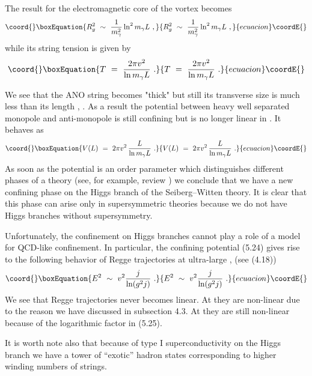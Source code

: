 \documentclass[a4paper,12pt]{article}
\def\la{\mathrel{\mathpalette\fun <}}
\def\fun#1#2{\lower3.6pt\vbox{\baselineskip0pt\lineskip.9pt
\ialign{\myHighlight{$\mathsurround=0pt#1\hfil##\hfil$}\coordHE{}\crcr#2\crcr\sim\crcr}}}
\begin{document}
The result for the electromagnetic core of the vortex becomes
\cite{Y}
\begin{equation}\coord{}\boxEquation{
R^2_g\ \sim\ \frac1{m^2_\gamma}\ln^2m_\gamma L\ ,
}{
R^2_g\ \sim\ \frac1{m^2_\gamma}\ln^2m_\gamma L\ ,
}{ecuacion}\coordE{}\end{equation}
while its string tension is given by \cite{Y}
\begin{equation}\coord{}\boxEquation{
T\ =\ \frac{2\pi v^2}{\ln m_\gamma L}\ .
}{
T\ =\ \frac{2\pi v^2}{\ln m_\gamma L}\ .
}{ecuacion}\coordE{}\end{equation}

We see that the ANO string becomes "thick" but still its
transverse size \coordHE{} is much less than its length \coordHE{}, \coordHE{}. As a result the potential between heavy well separated
monopole and anti-monopole is still  confining but is
no longer linear in \coordHE{}. It behaves
as \cite{Y}
\begin{equation}\coord{}\boxEquation{
V(L)\ =\ 2\pi v^2\, \frac L{\ln m_\gamma L}\ .
}{
V(L)\ =\ 2\pi v^2\, \frac L{\ln m_\gamma L}\ .
}{ecuacion}\coordE{}\end{equation}
 As soon as the
potential \coordHE{} is an order parameter which distinguishes 
different phases of a theory
(see, for example, review
\cite{IS}) we conclude that we have a new confining phase on the
Higgs branch of the Seiberg--Witten theory. It is clear that
this phase can arise only in supersymmetric theories
because we do not have Higgs branches without supersymmetry.

Unfortunately, the confinement on Higgs branches cannot play a
role of a model for QCD-like confinement. In particular, the
confining potential (5.24) gives rise to the following behavior
of Regge trajectories at ultra-large \coordHE{}, \coordHE{} (see
(4.18))
\begin{equation}\coord{}\boxEquation{
E^2\ \sim\ v^2\frac j{\ln(g^2j)}\ .
}{
E^2\ \sim\ v^2\frac j{\ln(g^2j)}\ .
}{ecuacion}\coordE{}\end{equation}
We see that Regge trajectories never becomes linear. At
\myHighlight{$j\la1/g^2$}\coordHE{} they are non-linear due to the reason we have
discussed in subsection 4.3. At \coordHE{} they are still
non-linear because of the logarithmic factor in (5.25).

It is worth note also that because of type I superconductivity 
on the Higgs branch we
have a tower of ``exotic'' hadron states corresponding to higher
winding numbers of strings. 
\end{document}
